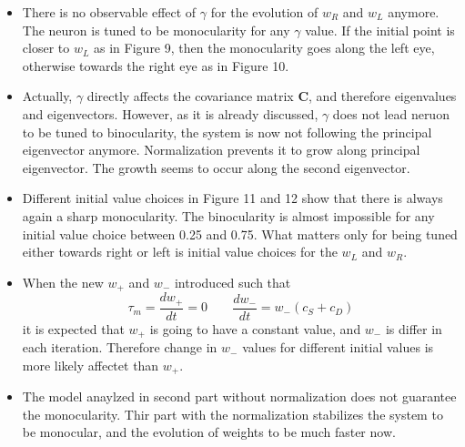 \documentclass{article}
\begin{document}
\begin{itemize}
 \item There is no observable effect of $\gamma$ for the evolution of $w_R$ and $w_L$ anymore. The neuron is tuned to be monocularity for any $\gamma$ value. If the initial point is closer to $w_L$ as in Figure 9, then the monocularity goes along the left eye, otherwise towards the right eye as in Figure 10.

\item Actually, $\gamma$ directly affects the covariance matrix \textbf{C}, and therefore eigenvalues and eigenvectors. However, as it is already discussed, $\gamma$ does not lead neruon to be tuned to binocularity, the system is now not following the principal eigenvector anymore. Normalization prevents it to grow along principal eigenvector. The growth seems to occur along the second eigenvector. 

\item Different initial value choices in Figure 11 and 12 show that there is always again a sharp monocularity. The binocularity is almost impossible for any initial value choice between 0.25 and 0.75. What matters only for being tuned either towards right or left is initial value choices for the $w_L$ and $w_R$. 

\item When the new $w_+$ and $w_-$ introduced such that
\begin{equation*}
 \tau_m=\frac{dw_+}{dt}=0 \;\;\;\;\;\;\; \frac{dw_-}{dt}=w_-(c_S+c_D)
\end{equation*}
it is expected that $w_+$ is going to have a constant value, and $w_-$ is differ in each iteration. Therefore change in $w_-$ values for different initial values is more likely affectet than $w_+$.

\item The model anaylzed in second part without normalization does not guarantee the monocularity. Thir part with the normalization stabilizes the system to be monocular, and the evolution of weights to be much faster now.

\end{itemize}
\end{document}
